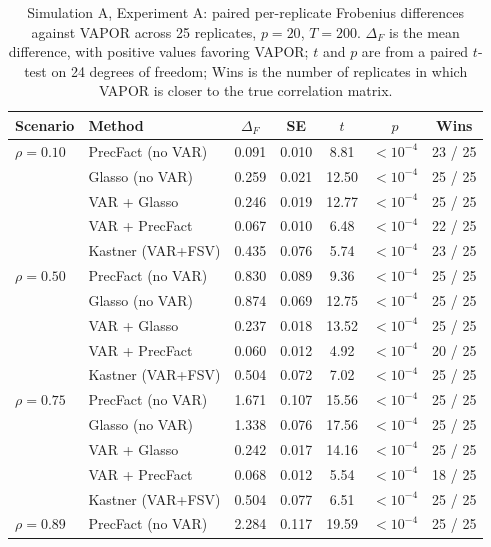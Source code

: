 \begin{table}[h!]
\centering
\small
\caption{Simulation A, Experiment A: paired per-replicate Frobenius differences against VAPOR across 25 replicates, $p=20$, $T=200$. $\Delta_F$ is the mean difference, with positive values favoring VAPOR; $t$ and $p$ are from a paired $t$-test on 24 degrees of freedom; Wins is the number of replicates in which VAPOR is closer to the true correlation matrix.}
\label{tab:sim-a-paired-autocorr}
\begin{tabular}{llccccc}
\toprule
Scenario & Method & $\Delta_F$ & SE & $t$ & $p$ & Wins \\
\midrule
$\rho = 0.10$ & PrecFact (no VAR)  & 0.091 & 0.010 & 8.81 & $<10^{-4}$ & 23 / 25 \\
              & Glasso (no VAR)    & 0.259 & 0.021 & 12.50 & $<10^{-4}$ & 25 / 25 \\
              & VAR + Glasso       & 0.246 & 0.019 & 12.77 & $<10^{-4}$ & 25 / 25 \\
              & VAR + PrecFact     & 0.067 & 0.010 &  6.48 & $<10^{-4}$ & 22 / 25 \\
              & Kastner (VAR+FSV)  & 0.435 & 0.076 &  5.74 & $<10^{-4}$ & 23 / 25 \\
\midrule
$\rho = 0.50$ & PrecFact (no VAR)  & 0.830 & 0.089 &  9.36 & $<10^{-4}$ & 25 / 25 \\
              & Glasso (no VAR)    & 0.874 & 0.069 & 12.75 & $<10^{-4}$ & 25 / 25 \\
              & VAR + Glasso       & 0.237 & 0.018 & 13.52 & $<10^{-4}$ & 25 / 25 \\
              & VAR + PrecFact     & 0.060 & 0.012 &  4.92 & $<10^{-4}$ & 20 / 25 \\
              & Kastner (VAR+FSV)  & 0.504 & 0.072 &  7.02 & $<10^{-4}$ & 25 / 25 \\
\midrule
$\rho = 0.75$ & PrecFact (no VAR)  & 1.671 & 0.107 & 15.56 & $<10^{-4}$ & 25 / 25 \\
              & Glasso (no VAR)    & 1.338 & 0.076 & 17.56 & $<10^{-4}$ & 25 / 25 \\
              & VAR + Glasso       & 0.242 & 0.017 & 14.16 & $<10^{-4}$ & 25 / 25 \\
              & VAR + PrecFact     & 0.068 & 0.012 &  5.54 & $<10^{-4}$ & 18 / 25 \\
              & Kastner (VAR+FSV)  & 0.504 & 0.077 &  6.51 & $<10^{-4}$ & 25 / 25 \\
\midrule
$\rho = 0.89$ & PrecFact (no VAR)  & 2.284 & 0.117 & 19.59 & $<10^{-4}$ & 25 / 25 \\

\end{tabular}
\end{table}
